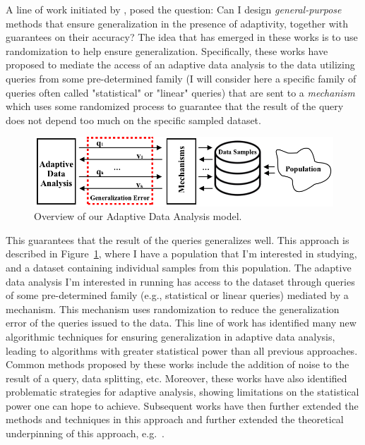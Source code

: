 A line of work initiated by \cite{DworkFHPRR15}, \cite{HardtU14} posed the question: 
Can I design \emph{general-purpose} methods that ensure generalization in the presence of adaptivity, together with guarantees on their accuracy? 
The idea that has emerged in these works is to use randomization to help ensure generalization. 
Specifically, these works have proposed to mediate the access of an adaptive data analysis to the data utilizing queries from some pre-determined family (I will consider here a specific family of queries often called "statistical" or "linear" queries) that are sent to a 
\emph{mechanism} which uses some randomized process to guarantee that the result of the query does not depend too much on the specific
sampled dataset. 
%
\begin{figure}
 \centering
 \includegraphics[width=0.7\columnwidth]{figures/data_analysis_model.png}
 \caption{Overview of our Adaptive Data Analysis model.}
 \label{fig:adaptivity-model-overview}
\vspace{-0.5cm}
\end{figure}
This guarantees that the result of the queries generalizes well. 
This approach is described in Figure~\ref{fig:adaptivity-model-overview}, where
I have a population that I'm interested in studying, and a dataset containing individual samples from this population. The adaptive data analysis I'm interested in running has access to the dataset through queries of some pre-determined family (e.g., statistical or linear queries) mediated by a mechanism. 
This mechanism uses randomization to reduce the generalization error of the queries issued to the data.
This line of work has identified many new algorithmic techniques for ensuring generalization in adaptive data analysis, leading to algorithms with greater statistical power than all previous approaches. 
Common methods proposed by these works include the addition of noise to the result of a query, data splitting, etc. 
Moreover, these works have also identified problematic strategies for adaptive analysis, showing limitations on the statistical power one can hope to achieve. 
Subsequent works have then further extended the methods and techniques in this approach and further extended the theoretical underpinning of this approach, 
e.g.~\cite{dwork2015reusable,dwork2015generalization,BassilyNSSSU16,UllmanSNSS18,FeldmanS17,jung2019new,SteinkeZ20,RogersRSSTW20}.
%

